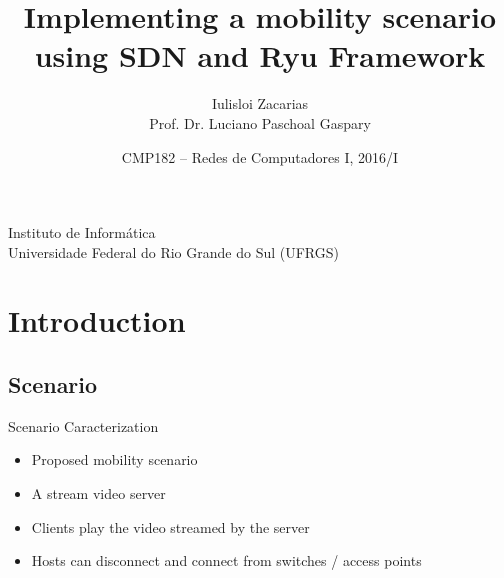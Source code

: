 \documentclass{beamer}
\begin{document}
\title
{Implementing a mobility scenario using SDN and Ryu Framework}


\author
{Iulisloi Zacarias \\ Prof. Dr. Luciano Paschoal Gaspary}

\institute
{
  Instituto de Informática\\
  Universidade Federal do Rio Grande do Sul (UFRGS)
}

\date[CMP166]
{CMP182 – Redes de Computadores I, 2016/I}






\frame[plain]{\titlepage}


\section{Introduction}

\subsection{Scenario}

\begin{frame}{Scenario Caracterization}
\begin{itemize}
  \item Proposed mobility scenario
  \item A stream video server
  \item Clients play the video streamed by the server
  \item Hosts can disconnect and connect from switches / access points 
\end{itemize}
\end{frame}
\end{document}
